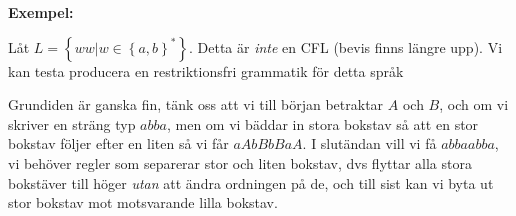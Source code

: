 \par\bigskip
\noindent\textbf{Exempel:}\par
\noindent Låt $L = \left\{ww|w\in\left\{a,b\right\}^*\right\}$. Detta är \textit{inte} en CFL (bevis finns längre upp). Vi kan testa producera en restriktionsfri grammatik för detta språk\par
\noindent Grundiden är ganska fin, tänk oss att vi till början betraktar $A$ och $B$, och om vi skriver en sträng typ $abba$, men om vi bäddar in stora bokstav så att en stor bokstav följer efter en liten så vi får $aAbBbBaA$. I slutändan vill vi få $abbaabba$, vi behöver regler som separerar stor och liten bokstav, dvs flyttar alla stora bokstäver till höger \textit{utan} att ändra ordningen på de, och till sist kan vi byta ut stor bokstav mot motsvarande lilla bokstav. 

